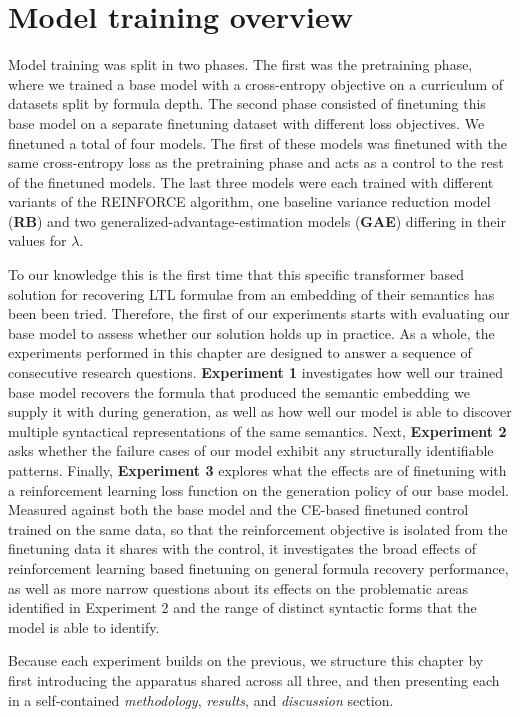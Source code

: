 \documentclass[titlepage,a4paper,11pt]{report}
\begin{document}
    \section{Model training overview}\label{sec:model_training_overview}
    Model training was split in two phases. The first was the pretraining phase, where we trained a base model with a cross-entropy objective on a curriculum of datasets split by formula depth. The second phase consisted of finetuning this base model on a separate finetuning dataset with different loss objectives. We finetuned a total of four models. The first of these models was finetuned with the same cross-entropy loss as the pretraining phase and acts as a control to the rest of the finetuned models. The last three models were each trained with different variants of the REINFORCE algorithm, one baseline variance reduction model (\textbf{RB}) and two generalized-advantage-estimation models (\textbf{GAE}) differing in their values for $\lambda$.
    
    To our knowledge this is the first time that this specific transformer based solution for recovering LTL formulae from an embedding of their semantics has been been tried. Therefore, the first of our experiments starts with evaluating our base model to assess whether our solution holds up in practice. As a whole, the experiments performed in this chapter are designed to answer a sequence of consecutive research questions. \textbf{Experiment 1} investigates how well our trained base model recovers the formula that produced the semantic embedding we supply it with during generation, as well as how well our model is able to discover multiple syntactical representations of the same semantics. Next, \textbf{Experiment 2} asks whether the failure cases of our model exhibit any structurally identifiable patterns. Finally, \textbf{Experiment 3} explores what the effects are of finetuning with a reinforcement learning loss function on the generation policy of our base model. Measured against both the base model and the CE-based finetuned control trained on the same data, so that the reinforcement objective is isolated from the finetuning data it shares with the control, it investigates the broad effects of reinforcement learning based finetuning on general formula recovery performance, as well as more narrow questions about its effects on the problematic areas identified in Experiment 2 and the range of distinct syntactic forms that the model is able to identify. 
    
    Because each experiment builds on the previous, we structure this chapter by first introducing the apparatus shared across all three, and then presenting each in a self-contained \textit{methodology}, \textit{results}, and \textit{discussion} section.
    
\end{document}

